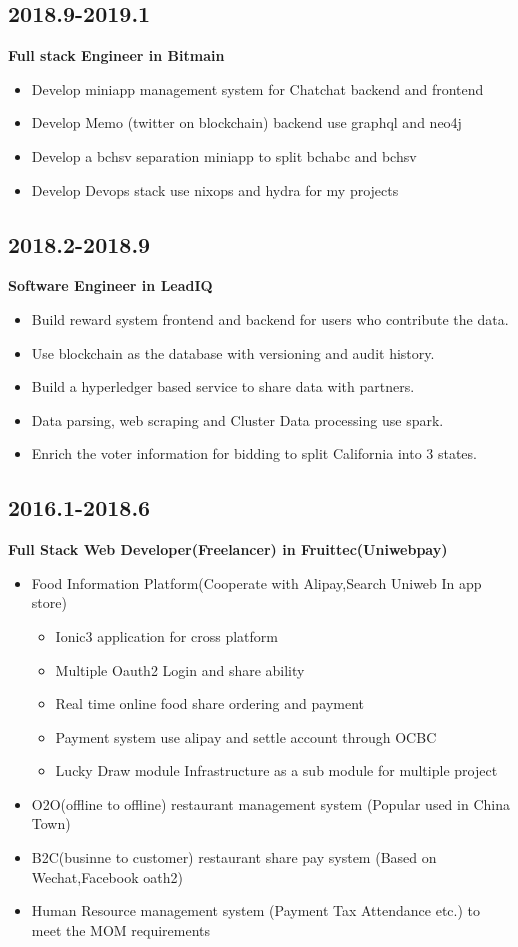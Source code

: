 \documentclass[11pt]{article}
\begin{document}
\subsection{2018.9-2019.1}
\label{sec:org3dba917}
\textbf{Full stack Engineer in Bitmain}
\begin{itemize}
\item Develop miniapp management system for Chatchat backend and frontend
\item Develop Memo (twitter on blockchain) backend use graphql and neo4j
\item Develop a bchsv separation miniapp to split bchabc and bchsv
\item Develop Devops stack use nixops and hydra for my projects
\end{itemize}
\subsection{2018.2-2018.9}
\label{sec:org324efb9}
\textbf{Software Engineer in LeadIQ}
\begin{itemize}
\item Build reward system frontend and backend for users who contribute the data.
\item Use blockchain as the database with versioning and audit history.
\item Build a hyperledger based service to share data with partners.
\item Data parsing, web scraping and Cluster Data processing use spark.
\item Enrich the voter information for bidding to split California into 3 states.
\end{itemize}
\subsection{2016.1-2018.6}
\label{sec:org90dd0f1}
\textbf{Full Stack Web Developer(Freelancer) in Fruittec(Uniwebpay)}

\begin{itemize}
\item Food Information Platform(Cooperate with Alipay,Search Uniweb In app store)
\begin{itemize}
\item Ionic3 application for cross platform
\item Multiple Oauth2 Login and share ability
\item Real time online food share ordering and payment
\item Payment system use alipay and settle account through OCBC
\item Lucky Draw module Infrastructure as a sub module for multiple project
\end{itemize}

\item O2O(offline to offline) restaurant management system (Popular used in China Town)
\item B2C(businne to customer) restaurant share pay system (Based on Wechat,Facebook oath2)
\item Human Resource management system (Payment Tax Attendance etc.) to meet the MOM requirements
\end{itemize}
\end{document}
